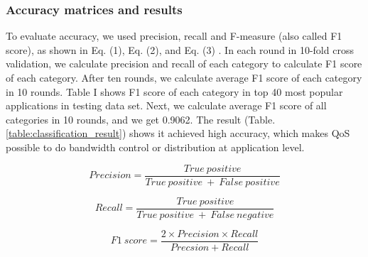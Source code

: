 \documentclass[journal]{IEEEtran}
\begin{document}
\subsubsection{Accuracy matrices and results}
To evaluate accuracy, we used precision, recall and F-measure (also called F1 score),
as shown in Eq. (1), Eq. (2), and Eq. (3) \cite{muc4}. In each round in 10-fold cross validation,
we calculate precision and recall of each category to calculate F1 score of each category.
After ten rounds, we calculate average F1 score of each category in 10 rounds. Table I shows F1 score of each category in top 40 most popular applications in testing data set. Next, we calculate average F1 score of all categories in 10 rounds, and we get 0.9062. The result (Table. \ref{table:classification_result}) shows it achieved high accuracy, which makes QoS possible to do bandwidth control or distribution at application level.


\begin{equation}
\label{eqn_1}
Precision = \dfrac{True\ positive}{True\ positive\ +\ False\ positive}
\end{equation}

\begin{equation}
\label{eqn_2}
Recall = \dfrac{True\ positive}{True\ positive\ +\ False\ negative}
\end{equation}

\begin{equation}
\label{eqn_3}
F1\ score = \dfrac{2\times Precision\times Recall}{Precsion + Recall}
\end{equation}
\end{document}
